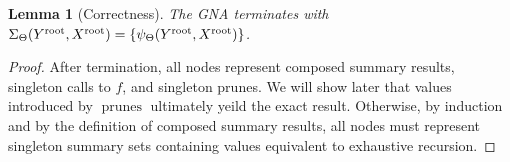 \documentclass{article}
\newtheorem{lemma}{Lemma}
\newcommand{\killspace}{\vspace{-0.08in}}
\newcommand{\GNP}[1][\psi]{{#1}_{\Theta}}
\DeclareMathOperator{\prunes}{prunes}
\newcommand{\kdroot}[1]{#1^{\text{\rm root}}}
\begin{document}
\begin{lemma}[Correctness]
  The GNA terminates with $\GNP[\Sigma](\kdroot{Y},\kdroot{X}) =
  \{\GNP(\kdroot{Y},\kdroot{X})\}$.
\end{lemma}
\killspace
\killspace
\begin{proof}
  After termination, all nodes represent composed summary results,
  singleton calls to $f$, and singleton prunes.  We will show later
  that values introduced by $\prunes$ ultimately yeild the exact
  result.  Otherwise, by induction and by the definition of composed
  summary results, all nodes must represent singleton summary sets
  containing values equivalent to exhaustive recursion.
\end{proof}
\killspace
\end{document}
